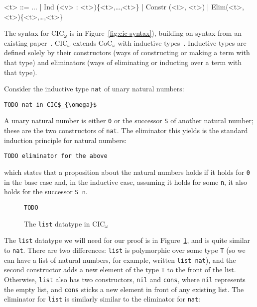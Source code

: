 \begin{figure*}
\small
\begin{grammar}
<t> ::= ... | \hspace{0.06cm} Ind (<v> : <t>)\{<t>,\ldots,<t>\} \hspace{0.06cm} | \hspace{0.06cm} Constr (<i>, <t>) \hspace{0.06cm} | \hspace{0.06cm} Elim(<t>, <t>)\{<t>,\ldots,<t>\}
\end{grammar}
\vspace{-0.3cm}
\caption{CIC$_\omega$ is CoC$_\omega$ with inductive types, inductive constructors, and eliminators.}
\label{fig:cic-syntax}
\end{figure*}

The syntax for CIC$_{\omega}$ is in Figure~\ref{fig:cic-syntax}), building on syntax from an existing paper~\cite{Timany2015FirstST}.
CIC$_{\omega}$ extends CoC$_{\omega}$ with inductive types~\cite{inductive}.
Inductive types are defined solely by their constructors (ways of constructing or making a term with that type)
and eliminators (ways of eliminating or inducting over a term with that type).

Consider the inductive type \lstinline{nat} of unary natural numbers:

\begin{lstlisting}
TODO nat in CIC$_{\omega}$
\end{lstlisting}
A unary natural number is either \lstinline{0} or the successor \lstinline{S} of another natural number;
these are the two constructors of \lstinline{nat}.
The eliminator this yields is the standard induction principle for natural numbers:

\begin{lstlisting}
TODO eliminator for the above
\end{lstlisting}
which states that a proposition about the natural numbers holds if it holds for \lstinline{0} in the base case and, in the inductive case,
assuming it holds for some \lstinline{n}, it also holds for the successor \lstinline{S n}.

\begin{figure}
\begin{lstlisting}
TODO
\end{lstlisting}
\caption{The \lstinline{list} datatype in CIC$_{\omega}$}
\label{fig:list-theory}
\end{figure}

The \lstinline{list} datatype we will need for our proof is in Figure~\ref{fig:list-theory}, and is quite similar to \lstinline{nat}.
There are two differences: \lstinline{list} is polymorphic over some type \lstinline{T} (so we can have a list of natural numbers,
for example, written \lstinline{list nat}), and the second constructor adds a new element of the type \lstinline{T} to the front of the list.
Otherwise, \lstinline{list} also has two constructors, \lstinline{nil} and \lstinline{cons}, where \lstinline{nil} represents the empty list,
and \lstinline{cons} sticks a new element in front of any existing list.
The eliminator for \lstinline{list} is similarly similar to the eliminator for \lstinline{nat}:


